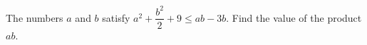 The numbers $a$ and $b$ satisfy $a^{2}+\dfrac{b^{2}}{2}+9 \leqslant ab-3b$. Find the value of the product $ab$.
